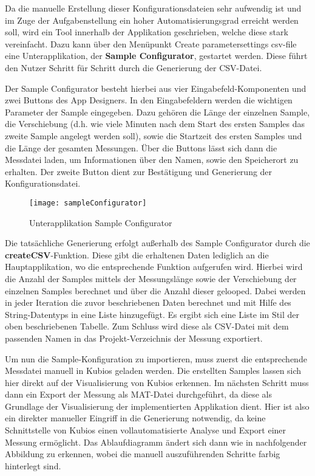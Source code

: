 Da die manuelle Erstellung dieser Konfigurationsdateien sehr aufwendig ist und im Zuge der Aufgabenstellung ein hoher Automatisierungsgrad erreicht werden soll, wird ein Tool innerhalb der Applikation geschrieben, welche diese stark vereinfacht. Dazu kann über den Menüpunkt \glqq Create parametersettings csv-file\grqq{} eine Unterapplikation, der \textbf{Sample Configurator}, gestartet werden. Diese führt den Nutzer Schritt für Schritt durch die Generierung der CSV-Datei.   

Der Sample Configurator besteht hierbei aus vier Eingabefeld-Komponenten und zwei Buttons des App Designers. In den Eingabefeldern werden die wichtigen Parameter der Sample eingegeben. Dazu gehören die Länge der einzelnen Sample, die Verschiebung (d.h. wie viele Minuten nach dem Start des ersten Samples das zweite Sample angelegt werden soll), sowie die Startzeit des ersten Samples und die Länge der gesamten Messungen. Über die Buttons lässt sich dann die Messdatei laden, um Informationen über den Namen, sowie den Speicherort zu erhalten. Der zweite Button dient zur Bestätigung und Generierung der Konfigurationsdatei.

\begin{figure}[H]
	\centering
	\texttt{[image: sampleConfigurator]}
	\caption{Unterapplikation Sample Configurator}
	\label{fig:sampleConfigurator}
\end{figure}

Die tatsächliche Generierung erfolgt außerhalb des Sample Configurator durch die \textbf{createCSV}-Funktion. Diese gibt die erhaltenen Daten lediglich an die Hauptapplikation, wo die entsprechende Funktion aufgerufen wird. Hierbei wird die Anzahl der Samples mittels der Messungslänge sowie der Verschiebung der einzelnen Samples berechnet und über die Anzahl dieser gelooped. Dabei werden in jeder Iteration die zuvor beschriebenen Daten berechnet und mit Hilfe des String-Datentyps in eine Liste hinzugefügt. Es ergibt sich eine Liste im Stil der oben beschriebenen Tabelle. Zum Schluss wird diese als CSV-Datei mit dem passenden Namen in das Projekt-Verzeichnis der Messung exportiert.

\begin{minipage}{\linewidth}

\end{minipage}

Um nun die Sample-Konfiguration zu importieren, muss zuerst die entsprechende Messdatei manuell in Kubios geladen werden. Die erstellten Samples lassen sich hier direkt auf der Visualisierung von Kubios erkennen. Im nächsten Schritt muss dann ein Export der Messung als MAT-Datei durchgeführt, da diese als Grundlage der Visualisierung der implementierten Applikation dient. Hier ist also ein direkter manueller Eingriff in die Generierung notwendig, da keine Schnittstelle von Kubios einen vollautomatisierte Analyse und Export einer Messung ermöglicht. Das Ablaufdiagramm ändert sich dann wie in nachfolgender Abbildung zu erkennen, wobei die manuell auszuführenden Schritte farbig hinterlegt sind.

